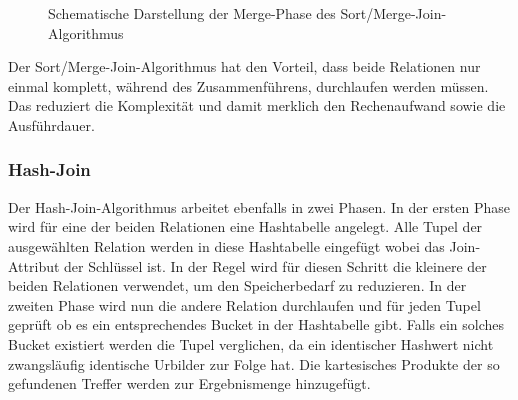 \documentclass[a4paper]{article}
\begin{document}
\begin{figure}[H]
\centering
{}
\hspace*{.5cm}
\caption{Schematische Darstellung der Merge-Phase des Sort/Merge-Join-Algorithmus}
\label{fig:sort-merge}
\end{figure}

Der Sort/Merge-Join-Algorithmus hat den Vorteil, dass beide Relationen nur einmal komplett, während des Zusammenführens, durchlaufen werden müssen. Das reduziert die Komplexität und damit merklich den Rechenaufwand sowie die Ausführdauer.

\subsubsection{Hash-Join}
Der Hash-Join-Algorithmus arbeitet ebenfalls in zwei Phasen. In der ersten Phase wird für eine der beiden Relationen eine Hashtabelle angelegt. Alle Tupel der ausgewählten Relation werden in diese Hashtabelle eingefügt wobei das Join-Attribut der Schlüssel ist. In der Regel wird für diesen Schritt die kleinere der beiden Relationen verwendet, um den Speicherbedarf zu reduzieren. In der zweiten Phase wird nun die andere Relation durchlaufen und für jeden Tupel geprüft ob es ein entsprechendes Bucket in der Hashtabelle gibt. Falls ein solches Bucket existiert werden die Tupel verglichen, da ein identischer Hashwert nicht zwangsläufig identische Urbilder zur Folge hat. Die kartesisches Produkte der so gefundenen Treffer werden zur Ergebnismenge hinzugefügt.
\end{document}
